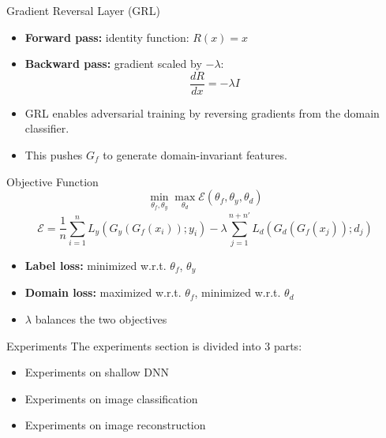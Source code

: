 \documentclass{beamer}
\begin{document}
\begin{frame}{Gradient Reversal Layer (GRL)}
\begin{itemize}
    \item \textbf{Forward pass:} identity function: $R(x) = x$
    \item \textbf{Backward pass:} gradient scaled by $-\lambda$: 
    \[
    \frac{dR}{dx} = -\lambda I
    \]
    \item GRL enables adversarial training by reversing gradients from the domain classifier.
    \item This pushes $G_f$ to generate domain-invariant features.
\end{itemize}
\end{frame}

\begin{frame}{Objective Function}
\[
\min_{\theta_f, \theta_y} \max_{\theta_d} \mathcal{E}(\theta_f, \theta_y, \theta_d)
\]
\vspace{-1em}
\[
\mathcal{E} = \frac{1}{n} \sum_{i=1}^{n} L_y(G_y(G_f(x_i)); y_i) 
- \lambda \sum_{j=1}^{n+n'} L_d(G_d(G_f(x_j)); d_j)
\]
\begin{itemize}
    \item \textbf{Label loss:} minimized w.r.t. $\theta_f$, $\theta_y$
    \item \textbf{Domain loss:} maximized w.r.t. $\theta_f$, minimized w.r.t. $\theta_d$
    \item $\lambda$ balances the two objectives
\end{itemize}
\end{frame}

\begin{frame}{Experiments}
The experiments section is divided into 3 parts: 
\begin{itemize}
    \item Experiments on shallow DNN
    \item Experiments on image classification
    \item Experiments on image reconstruction
\end{itemize}
    
\end{frame}
\end{document}
